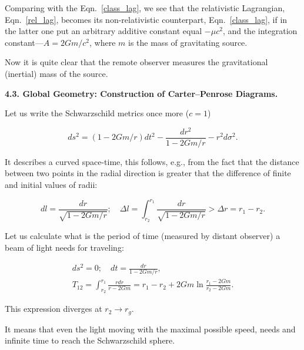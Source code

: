 Comparing with the Eqn.~\eqref{class_lag}, we see that the relativistic Lagrangian, Eqn.~\eqref{rel_lag}, be\-co\-mes its non-relativistic counterpart, Eqn.~\eqref{class_lag}, if in the latter one put an arbitrary additive constant equal $-\mu c^2$, and the integration constant---$A={2Gm}/{c^2}$, where $m$ is the mass of gravitating source. 

Now it is quite clear that the remote observer measures the gravitational (inertial) mass of the source.



\smallskip



\textbf{4.3. Global Geometry: Construction of Carter--Penrose Diagrams.}

Let us write the Schwarzschild metrics once more ($c=1$)

\begin{equation}

\label{swd_int1}

ds^2=\left(1-{2Gm}/{r}\right)dt^2 -\frac{dr^2}{1-{2Gm}/{r}}-r^2d\sigma^2.

\end{equation}

It describes a curved space-time, this follows, e.g., from the fact that the distance between two points in the radial direction is greater that the difference of finite and initial values of radii:

\begin{equation}

dl = \frac{dr}{\sqrt{1-{2Gm}/{r}}};\quad 

\Delta l = \int_{r_2}^{r_1} \frac{dr}{\sqrt{1-{2Gm}/{r}}} > \Delta r=r_1-r_2 .

\end{equation}

Let us calculate what is the period of time (measured by distant observer) a beam of light needs for traveling:

\begin{gather}

ds^2 =0; \quad dt = \frac{dr}{1-{2Gm}/{r}}, \\

T_{12} =\int_{r_2}^{r_1} \frac{rdr}{r-2Gm} =r_1 - r_2 + 2Gm\ln\frac{r_1-2Gm}{r_2-2Gm}.

\end{gather}

This expression diverges at $r_2 \to r_g$. 

It means that even the light moving with the maximal possible speed, needs and infinite time to reach the Schwarzschild sphere.

